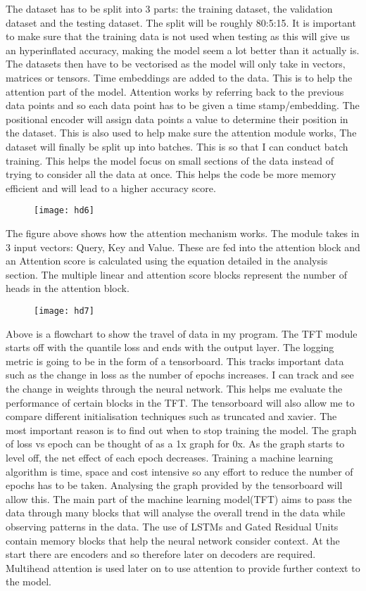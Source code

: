 \documentclass{article}
\begin{document}
The dataset has to be split into 3 parts: the training dataset, the validation dataset and the testing dataset. The split will be roughly 80:5:15. It is important to make sure that the training data is not used when testing as this will give us an hyperinflated accuracy, making the model seem a lot better than it actually is.
The datasets then have to be vectorised as the model will only take in vectors, matrices or tensors.
Time embeddings are added to the data. This is to help the attention part of the model. Attention works by referring back to the previous data points and so each data point has to be given a time stamp/embedding.
The positional encoder will assign data points a value to determine their position in the dataset. This is also used to help make sure the attention module works,
The dataset will finally be split up into batches. This is so that I can conduct batch training. This helps the model focus on small sections of the data instead of trying to consider all the data at once. This helps the code be more memory efficient and will lead to a higher accuracy score.

\clearpage
\begin{figure}[ht]
    \centering
    \texttt{[image: hd6]}
    \caption{}
\end{figure}
The figure above shows how the attention mechanism works. The module takes in 3 input vectors: Query, Key and Value. These are fed into the attention block and an Attention score is calculated using the equation detailed in the analysis section. The multiple linear and attention score blocks represent the number of heads in the attention block.
\begin{figure}[ht]
    \centering
    \texttt{[image: hd7]}
    \caption{}
\end{figure}
Above is a flowchart to show the travel of data in my program. The TFT module starts off with the quantile loss and ends with the output layer.
The logging metric is going to be in the form of a tensorboard. This tracks important data such as the change in loss as the number of epochs increases. I can track and see the change in weights through the neural network. This helps me evaluate the performance of certain blocks in the TFT. The tensorboard will also allow me to compare different initialisation techniques such as truncated and xavier. The most important reason is to find out when to stop training the model. The graph of loss vs epoch can be thought of as a 1x graph for 0x. As the graph starts to level off, the net effect of each epoch decreases. Training a machine learning algorithm is time, space and cost intensive so any effort to reduce the number of epochs has to be taken. Analysing the graph provided by the tensorboard will allow this.
The main part of the machine learning model(TFT) aims to pass the data through many blocks that will analyse the overall trend in the data while observing patterns in the data. The use of LSTMs and Gated Residual Units contain memory blocks that help the neural network consider context. At the start there are encoders and so therefore later on decoders are required. Multihead attention is used later on to use attention to provide further context to the model.
\end{document}
